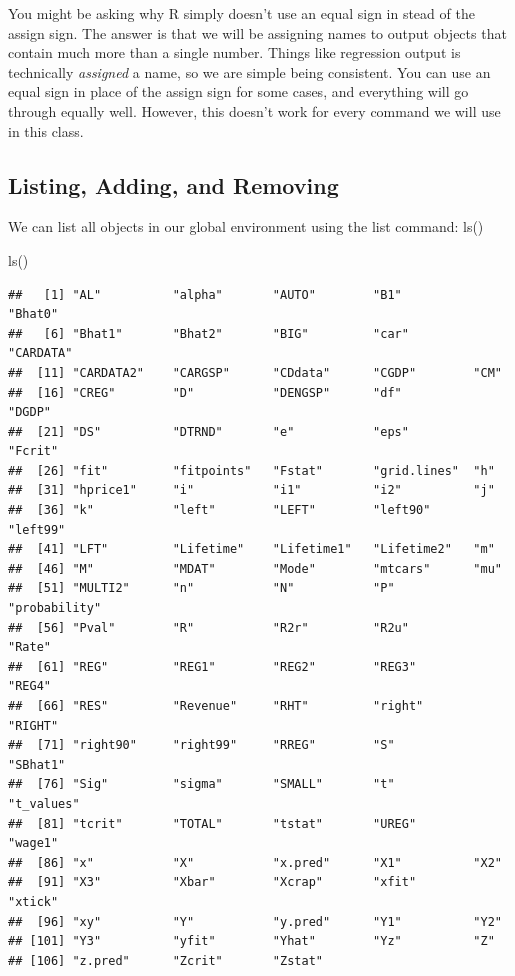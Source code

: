\documentclass[
]{book}
\newenvironment{Shaded}{\begin{snugshade}}{\end{snugshade}}
\newcommand{\FunctionTok}[1]{\textcolor[rgb]{0.00,0.00,0.00}{#1}}
\newcommand{\NormalTok}[1]{#1}
\begin{document}
You might be asking why R simply doesn't use an equal sign in stead of the assign sign. The answer is that we will be assigning names to output objects that contain much more than a single number. Things like regression output is technically \emph{assigned} a name, so we are simple being consistent. You can use an equal sign in place of the assign sign for some cases, and everything will go through equally well. However, this doesn't work for every command we will use in this class.

\hypertarget{listing-adding-and-removing}{%
\subsection{Listing, Adding, and Removing}\label{listing-adding-and-removing}}

We can list all objects in our global environment using the list command: ls()

\begin{Shaded}
\begin{Highlighting}[]
\FunctionTok{ls}\NormalTok{()}
\end{Highlighting}
\end{Shaded}

\begin{verbatim}
##   [1] "AL"          "alpha"       "AUTO"        "B1"          "Bhat0"      
##   [6] "Bhat1"       "Bhat2"       "BIG"         "car"         "CARDATA"    
##  [11] "CARDATA2"    "CARGSP"      "CDdata"      "CGDP"        "CM"         
##  [16] "CREG"        "D"           "DENGSP"      "df"          "DGDP"       
##  [21] "DS"          "DTRND"       "e"           "eps"         "Fcrit"      
##  [26] "fit"         "fitpoints"   "Fstat"       "grid.lines"  "h"          
##  [31] "hprice1"     "i"           "i1"          "i2"          "j"          
##  [36] "k"           "left"        "LEFT"        "left90"      "left99"     
##  [41] "LFT"         "Lifetime"    "Lifetime1"   "Lifetime2"   "m"          
##  [46] "M"           "MDAT"        "Mode"        "mtcars"      "mu"         
##  [51] "MULTI2"      "n"           "N"           "P"           "probability"
##  [56] "Pval"        "R"           "R2r"         "R2u"         "Rate"       
##  [61] "REG"         "REG1"        "REG2"        "REG3"        "REG4"       
##  [66] "RES"         "Revenue"     "RHT"         "right"       "RIGHT"      
##  [71] "right90"     "right99"     "RREG"        "S"           "SBhat1"     
##  [76] "Sig"         "sigma"       "SMALL"       "t"           "t_values"   
##  [81] "tcrit"       "TOTAL"       "tstat"       "UREG"        "wage1"      
##  [86] "x"           "X"           "x.pred"      "X1"          "X2"         
##  [91] "X3"          "Xbar"        "Xcrap"       "xfit"        "xtick"      
##  [96] "xy"          "Y"           "y.pred"      "Y1"          "Y2"         
## [101] "Y3"          "yfit"        "Yhat"        "Yz"          "Z"          
## [106] "z.pred"      "Zcrit"       "Zstat"
\end{verbatim}
\end{document}
